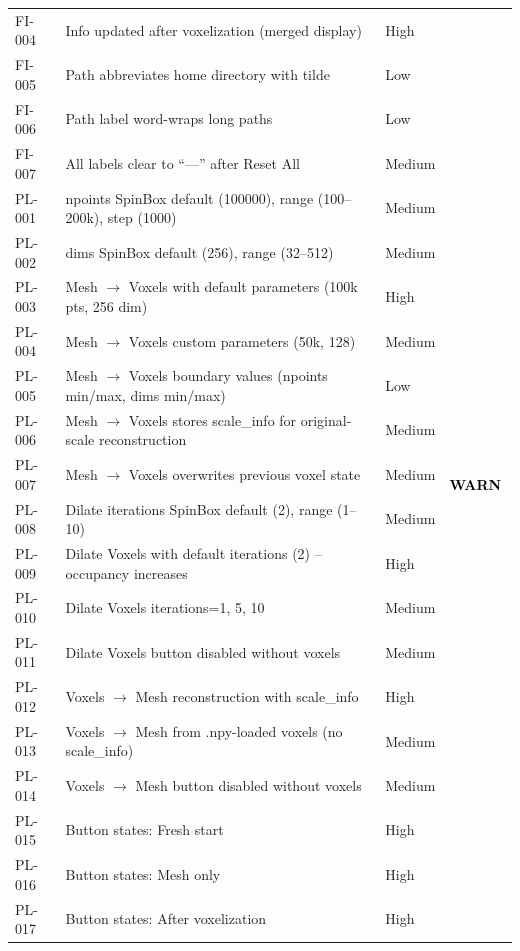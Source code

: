 \documentclass[12pt,a4paper]{article}
\newcommand{\statuspass}{\colorbox{statusgreen}{\textcolor{white}{\textbf{\,PASS\,}}}}
\newcommand{\statuswarn}{\colorbox{statusyellow}{\textcolor{black}{\textbf{\,WARN\,}}}}
\begin{document}
{\begin{longtable}{p{1.7cm}p{7.7cm}p{1.3cm}p{2cm}}
FI-004 & Info updated after voxelization (merged display) & High & \statuspass \\
FI-005 & Path abbreviates home directory with tilde & Low & \statuspass \\
FI-006 & Path label word-wraps long paths & Low & \statuspass \\
FI-007 & All labels clear to ``---'' after Reset All & Medium & \statuspass \\
PL-001 & npoints SpinBox default (100000), range (100--200k), step (1000) & Medium & \statuspass \\
PL-002 & dims SpinBox default (256), range (32--512) & Medium & \statuspass \\
PL-003 & Mesh $\rightarrow$ Voxels with default parameters (100k pts, 256 dim) & High & \statuspass \\
PL-004 & Mesh $\rightarrow$ Voxels custom parameters (50k, 128) & Medium & \statuspass \\
PL-005 & Mesh $\rightarrow$ Voxels boundary values (npoints min/max, dims min/max) & Low & \statuspass \\
PL-006 & Mesh $\rightarrow$ Voxels stores scale\_info for original-scale reconstruction & Medium & \statuspass \\
PL-007 & Mesh $\rightarrow$ Voxels overwrites previous voxel state & Medium & \statuswarn \\
PL-008 & Dilate iterations SpinBox default (2), range (1--10) & Medium & \statuspass \\
PL-009 & Dilate Voxels with default iterations (2) -- occupancy increases & High & \statuspass \\
PL-010 & Dilate Voxels iterations=1, 5, 10 & Medium & \statuspass \\
PL-011 & Dilate Voxels button disabled without voxels & Medium & \statuspass \\
PL-012 & Voxels $\rightarrow$ Mesh reconstruction with scale\_info & High & \statuspass \\
PL-013 & Voxels $\rightarrow$ Mesh from .npy-loaded voxels (no scale\_info) & Medium & \statuspass \\
PL-014 & Voxels $\rightarrow$ Mesh button disabled without voxels & Medium & \statuspass \\
PL-015 & Button states: Fresh start & High & \statuspass \\
PL-016 & Button states: Mesh only & High & \statuspass \\
PL-017 & Button states: After voxelization & High & \statuspass \\

\end{longtable}}
\end{document}
